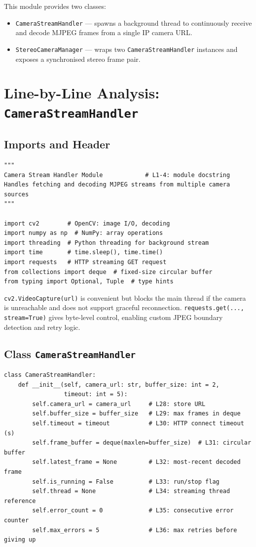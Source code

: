 \documentclass[12pt,a4paper,twoside]{report}
\theoremstyle{definition}
\newcommand{\code}[1]{\texttt{#1}}
\begin{document}
This module provides two classes:
\begin{itemize}
  \item \code{CameraStreamHandler} --- spawns a background thread to continuously
        receive and decode MJPEG frames from a single IP camera URL.
  \item \code{StereoCameraManager} --- wraps two \code{CameraStreamHandler} instances
        and exposes a synchronised stereo frame pair.
\end{itemize}

\section{Line-by-Line Analysis: \texttt{CameraStreamHandler}}

\subsection{Imports and Header}

\begin{lstlisting}
"""
Camera Stream Handler Module            # L1-4: module docstring
Handles fetching and decoding MJPEG streams from multiple camera sources
"""

import cv2        # OpenCV: image I/O, decoding
import numpy as np  # NumPy: array operations
import threading  # Python threading for background stream
import time       # time.sleep(), time.time()
import requests   # HTTP streaming GET request
from collections import deque  # fixed-size circular buffer
from typing import Optional, Tuple  # type hints
\end{lstlisting}

\begin{notebox}
\code{cv2.VideoCapture(url)} is convenient but blocks the main thread if the
camera is unreachable and does not support graceful reconnection.
\code{requests.get(..., stream=True)} gives byte-level control, enabling custom
JPEG boundary detection and retry logic.
\end{notebox}

\subsection{Class \texttt{CameraStreamHandler}}

\begin{lstlisting}
class CameraStreamHandler:
    def __init__(self, camera_url: str, buffer_size: int = 2,
                 timeout: int = 5):
        self.camera_url = camera_url     # L28: store URL
        self.buffer_size = buffer_size   # L29: max frames in deque
        self.timeout = timeout           # L30: HTTP connect timeout (s)
        self.frame_buffer = deque(maxlen=buffer_size)  # L31: circular buffer
        self.latest_frame = None         # L32: most-recent decoded frame
        self.is_running = False          # L33: run/stop flag
        self.thread = None               # L34: streaming thread reference
        self.error_count = 0             # L35: consecutive error counter
        self.max_errors = 5              # L36: max retries before giving up
\end{lstlisting}
\end{document}
